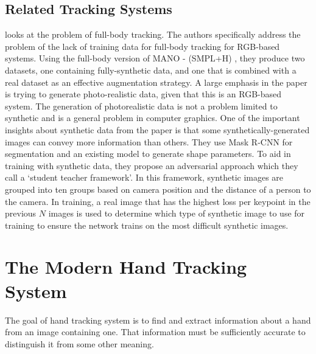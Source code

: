\subsection{Related Tracking Systems}

\cite{hoffmann2019learning} looks at the problem of full-body tracking. The authors specifically address the problem of the lack of training data for full-body tracking for RGB-based systems. Using the full-body version of MANO - (SMPL+H) \cite{romero2017embodied}, they produce two datasets, one containing fully-synthetic data, and one that is combined with a real dataset as an effective augmentation strategy. A large emphasis in the paper is trying to generate photo-realistic data, given that this is an RGB-based system. The generation of photorealistic data is not a problem limited to synthetic and is a general problem in computer graphics. One of the important insights about synthetic data from the paper is that some synthetically-generated images can convey more information than others. They use Mask R-CNN for segmentation and an existing model to generate shape parameters. To aid in training with synthetic data, they propose an adversarial approach which they call a `student teacher framework'. In this framework, synthetic images are grouped into ten groups based on camera position and the distance of a person to the camera. In training, a real image that has the highest loss per keypoint in the previous $N$ images is used to determine which type of synthetic image to use for training to ensure the network trains on the most difficult synthetic images.




\section{The Modern Hand Tracking System}
The goal of hand tracking system is to find and extract information about a hand from an image containing one. That information must be sufficiently accurate to distinguish it from some other meaning. 

